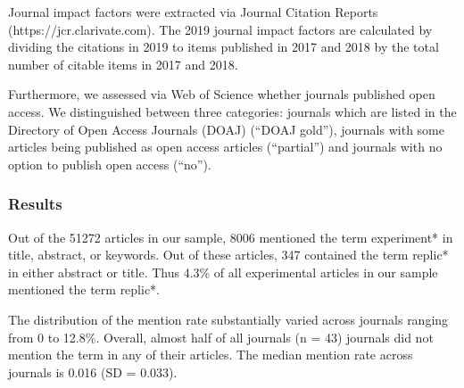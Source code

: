 \documentclass[]{elsarticle} %
\begin{document}
Journal impact factors were extracted via Journal Citation Reports
(https://jcr.clarivate.com). The 2019 journal impact factors are
calculated by dividing the citations in 2019 to items published in 2017
and 2018 by the total number of citable items in 2017 and 2018.

Furthermore, we assessed via Web of Science whether journals published
open access. We distinguished between three categories: journals which
are listed in the Directory of Open Access Journals (DOAJ) (``DOAJ
gold''), journals with some articles being published as open access
articles (``partial'') and journals with no option to publish open
access (``no'').

\hypertarget{results}{%
\subsubsection{Results}\label{results}}

Out of the 51272 articles in our sample, 8006 mentioned the term
experiment* in title, abstract, or keywords. Out of these articles, 347
contained the term replic* in either abstract or title. Thus 4.3\% of
all experimental articles in our sample mentioned the term replic*.

The distribution of the mention rate substantially varied across
journals ranging from 0 to 12.8\%. Overall, almost half of all journals
(n = 43) journals did not mention the term in any of their articles. The
median mention rate across journals is 0.016 (SD = 0.033).
\end{document}
